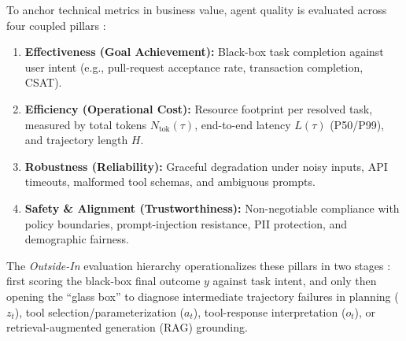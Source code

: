 \documentclass[../../../../master.tex]{subfiles}
\begin{document}
To anchor technical metrics in business value, agent quality is evaluated across four coupled pillars :
\begin{enumerate}
  \item \textbf{Effectiveness (Goal Achievement):} Black-box task completion against user intent (e.g., pull-request acceptance rate, transaction completion, CSAT).
  \item \textbf{Efficiency (Operational Cost):} Resource footprint per resolved task, measured by total tokens $N_{\mathrm{tok}}(\tau)$, end-to-end latency $L(\tau)$ (P50/P99), and trajectory length $H$.
  \item \textbf{Robustness (Reliability):} Graceful degradation under noisy inputs, API timeouts, malformed tool schemas, and ambiguous prompts.
  \item \textbf{Safety \& Alignment (Trustworthiness):} Non-negotiable compliance with policy boundaries, prompt-injection resistance, PII protection, and demographic fairness.
\end{enumerate}

The \emph{Outside-In} evaluation hierarchy operationalizes these pillars in two stages : first scoring the black-box final outcome $y$ against task intent, and only then opening the ``glass box'' to diagnose intermediate trajectory failures in planning ($z_t$), tool selection/parameterization ($a_t$), tool-response interpretation ($o_t$), or retrieval-augmented generation (RAG) grounding.
\end{document}
